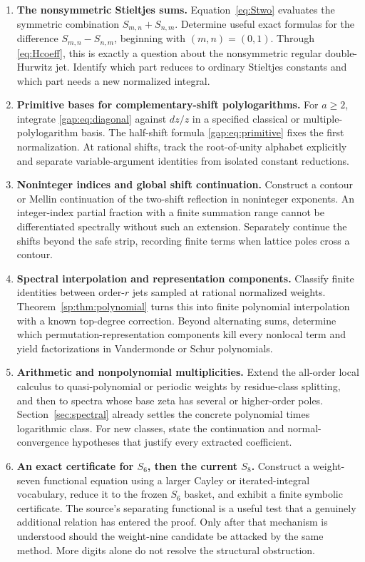 \documentclass[11pt,letterpaper]{article}
\numberwithin{equation}{section}
\theoremstyle{plain}
\theoremstyle{definition}
\theoremstyle{remark}
\begin{document}
\begin{enumerate}[leftmargin=*,label=\textbf{Q\arabic*.},itemsep=8pt]
\item \textbf{The nonsymmetric Stieltjes sums.}
Equation~\eqref{eq:Stwo} evaluates the symmetric combination
$S_{m,n}+S_{n,m}$. Determine useful exact formulas for the difference
$S_{m,n}-S_{n,m}$, beginning with $(m,n)=(0,1)$. Through
\eqref{eq:Hcoeff}, this is exactly a question about the nonsymmetric
regular double-Hurwitz jet. Identify which part reduces to ordinary
Stieltjes constants and which part needs a new normalized integral.

\item \textbf{Primitive bases for complementary-shift polylogarithms.}
For $a\ge2$, integrate \eqref{gap:eq:diagonal} against $dz/z$ in a
specified classical or multiple-polylogarithm basis. The half-shift
formula \eqref{gap:eq:primitive} fixes the first normalization.
At rational shifts, track the root-of-unity alphabet explicitly and
separate variable-argument identities from isolated constant reductions.

\item \textbf{Noninteger indices and global shift continuation.}
Construct a contour or Mellin continuation of the two-shift reflection
in noninteger exponents. An integer-index partial fraction with a
finite summation range cannot be differentiated spectrally without
such an extension. Separately continue the shifts beyond the safe
strip, recording finite terms when lattice poles cross a contour.

\item \textbf{Spectral interpolation and representation components.}
Classify finite identities between order-$r$ jets sampled at rational
normalized weights. Theorem~\ref{sp:thm:polynomial} turns this into
finite polynomial interpolation with a known top-degree correction.
Beyond alternating sums, determine which permutation-representation
components kill every nonlocal term and yield factorizations in
Vandermonde or Schur polynomials.

\item \textbf{Arithmetic and nonpolynomial multiplicities.}
Extend the all-order local calculus to quasi-polynomial or periodic
weights by residue-class splitting, and then to spectra whose base
zeta has several or higher-order poles. Section~\ref{sec:spectral}
already settles the concrete polynomial times logarithmic class.
For new classes, state the continuation and normal-convergence
hypotheses that justify every extracted coefficient.

\item \textbf{An exact certificate for $S_6$, then the current $S_8$.}
Construct a weight-seven functional equation using a larger Cayley or
iterated-integral vocabulary, reduce it to the frozen $S_6$ basket,
and exhibit a finite symbolic certificate. The source's separating
functional is a useful test that a genuinely additional relation has
entered the proof. Only after that mechanism is understood should
the weight-nine candidate be attacked by the same method. More
digits alone do not resolve the structural obstruction.


\end{enumerate}
\end{document}
